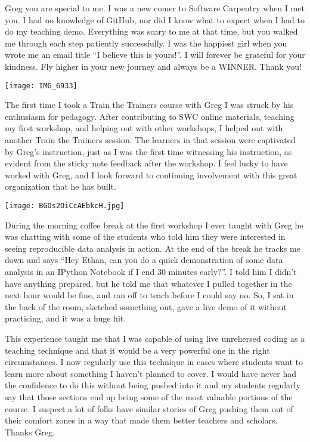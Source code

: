 Greg you are special to me. I was a new comer to Software Carpentry when I met
you. I had no knowledge of GitHub, nor did I know what to expect when I had to
do my teaching demo. Everything was scary to me at that time, but you walked me
through each step patiently successfully. I was the happiest girl when you
wrote me an email title ``I believe this is yours!''. I will forever be
grateful for your kindness. Fly higher in your new journey and always be a
WINNER. Thank you!

\vspace*{\fill}

\newpage

\texttt{[image: IMG\_6933]}

The first time I took a Train the Trainers course with Greg I was struck by his
enthusiasm for pedagogy. After contributing to SWC online materials, teaching
my first workshop, and helping out with other workshops, I helped out with
another Train the Trainers session. The learners in that session were
captivated by Greg's instruction, just as I was the first time witnessing his
instruction, as evident from the sticky note feedback after the workshop. I
feel lucky to have worked with Greg, and I look forward to continuing
involvement with this great organization that he has built.


\newpage

\begin{center}
\texttt{[image: BGDs2OiCcAEbkcH.jpg]}
\end{center}

During the morning coffee break at the first workshop I ever taught with Greg
he was chatting with some of the students who told him they were interested in
seeing reproducible data analysis in action. At the end of the break he tracks
me down and says ``Hey Ethan, can you do a quick demonstration of some data
analysis in an IPython Notebook if I end 30 minutes early?''. I told him I
didn't have anything prepared, but he told me that whatever I pulled together
in the next hour would be fine, and ran off to teach before I could say no. So,
I sat in the back of the room, sketched something out, gave a live demo of it
without practicing, and it was a huge hit.

This experience taught me that I was capable of using live unrehersed coding as
a teaching technique and that it would be a very powerful one in the right
circumstances. I now regularly use this technique in cases where students want
to learn more about something I haven't planned to cover. I would have never
had the confidence to do this without being pushed into it and my students
regularly say that those sections end up being some of the most valuable
portions of the course. I suspect a lot of folks have similar stories of Greg
pushing them out of their comfort zones in a way that made them better teachers
and scholars. Thanks Greg.

